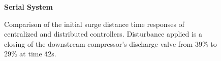\begin{figure}
  {\centering\large\textbf{Serial System}\\[1em]}
  \begin{subfigure}{0.40\linewidth}
    \footnotesize
    
    \normalsize
  \end{subfigure}
  \hfill
  \begin{subfigure}{0.40\linewidth}
    \footnotesize
    
    \normalsize
  \end{subfigure}
  \caption{Comparison of the initial surge distance time responses of centralized and distributed controllers. Disturbance applied is a closing of the downstream compressor's discharge valve from 39\% to 29\% at time \u{42}{s}.}
  \label{fig:res:serial-sd-zoom}
\end{figure}
\fi


